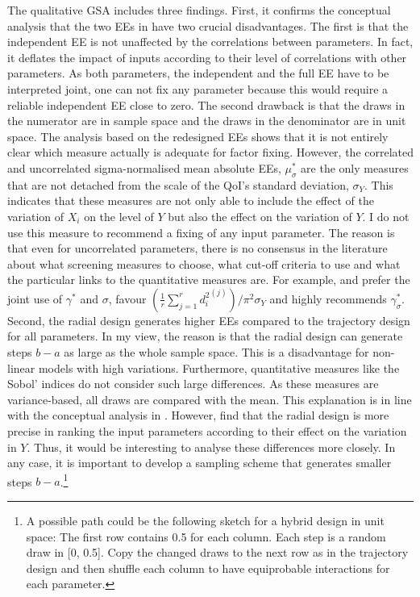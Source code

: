 \noindent
The qualitative GSA includes three findings.
First, it confirms the conceptual analysis that the two EEs in \cite{ge2017extending} have two crucial disadvantages. The first is that the independent EE is not unaffected by the correlations between parameters. In fact, it deflates the impact of inputs according to their level of correlations with other parameters. As both parameters, the independent and the full EE have to be interpreted joint, one can not fix any parameter because this would require a reliable independent EE close to zero. The second drawback is that the draws in the numerator are in sample space and the draws in the denominator are in unit space. The analysis based on the redesigned EEs shows that it is not entirely clear which measure actually is adequate for factor fixing. However, the correlated and uncorrelated sigma-normalised mean absolute EEs, $\mu_\sigma^*$ are the only measures that are not detached from the scale of the QoI's standard deviation, $\sigma_Y$. This indicates that these measures are not only able to include the effect of the variation of $X_i$ on the level of $Y$ but also the effect on the variation of $Y$. I do not use this measure to recommend a fixing of any input parameter. The reason is that even for uncorrelated parameters, there is no consensus in the literature about what screening measures to choose, what cut-off criteria to use and what the particular links to the quantitative measures are. For example, \cite{campolongo2007effective} and \cite{ge2017extending} prefer the joint use of $\gamma^*$ and $\sigma$, \cite{kucherenko2009derivative} favour $(\frac{1}{r} \sum_{j=1}^{r} {d_i^2}^{(j)})/\pi^2 \sigma_Y$ and \cite{Smith.2014} highly recommends $\gamma^*_{\sigma}$.\\

\noindent
Second, the radial design generates higher EEs compared to the trajectory design for all parameters. In my view, the reason is that the radial design can generate steps $b-a$ as large as the whole sample space. This is a disadvantage for non-linear models with high variations. Furthermore, quantitative measures like the Sobol' indices do not consider such large differences. As these measures are variance-based, all draws are compared with the mean. This explanation is in line with the conceptual analysis in \cite{kucherenko2009derivative}. However, \cite{campolongo2007effective} find that the radial design is more precise in ranking the input parameters according to their effect on the variation in $Y$. Thus, it would be interesting to analyse these differences more closely. In any case, it is important to develop a sampling scheme that generates smaller steps $b-a$.\footnote{A possible path could be the following sketch for a hybrid design in unit space: The first row contains 0.5 for each column. Each step is a random draw in [0, 0.5]. Copy the changed draws to the next row as in the trajectory design and then shuffle each column to have equiprobable interactions for each parameter.}\\

